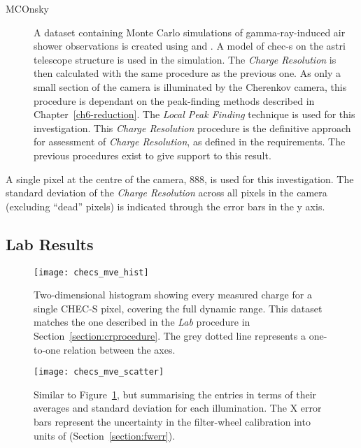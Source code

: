 \begin{description}
\item [MCOnsky] A dataset containing Monte Carlo simulations of gamma-ray-induced air shower observations is created using  and . A model of \gls{chec-s} on the \gls{astri} telescope structure is used in the simulation. The \textit{Charge Resolution} is then calculated with the same procedure as the previous one. As only a small section of the camera is illuminated by the Cherenkov camera, this procedure is dependant on the peak-finding methods described in Chapter~\ref{ch6-reduction}. The \textit{Local Peak Finding} technique is used for this investigation. This \textit{Charge Resolution} procedure is the definitive approach for assessment of \textit{Charge Resolution}, as defined in the requirements. The previous procedures exist to give support to this result.
\end{description}

A single pixel at the centre of the camera, 888, is used for this investigation. The standard deviation of the \textit{Charge Resolution} across all pixels in the camera (excluding ``dead'' pixels) is indicated through the error bars in the y axis.

\subsection{Lab Results}

\begin{figure}
	\centering
    \texttt{[image: checs\_mve\_hist]} 
	\caption[CHEC-S measured charge versus average expected charge.]{Two-dimensional histogram showing every measured charge for a single CHEC-S pixel, covering the full dynamic range. This dataset matches the one described in the \textit{Lab} procedure in Section~\ref{section:crprocedure}. The grey dotted line represents a one-to-one relation between the axes.}
	\label{fig:checs_mve_hist}
\end{figure}

\begin{figure}
	\centering
    \texttt{[image: checs\_mve\_scatter]} 
	\caption[CHEC-S average measured charge versus average expected charge.]{Similar to Figure~\ref{fig:checs_mve_hist}, but summarising the entries in terms of their averages and standard deviation for each illumination. The X error bars represent the uncertainty in the filter-wheel calibration into units of \si{\pe} (Section~\ref{section:fwerr}).}
	\label{fig:checs_mve_scatter}
\end{figure}

